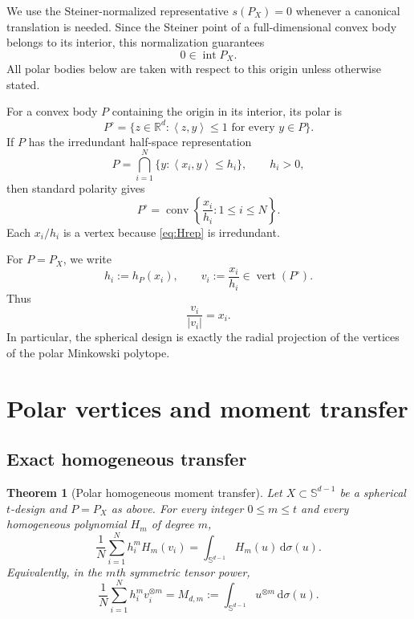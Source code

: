 \documentclass[11pt]{amsart}
\newtheorem{theorem}{Theorem}[section]
\theoremstyle{definition}
\theoremstyle{remark}
\newcommand{\R}{\mathbb R}
\newcommand{\Sph}{\mathbb S}
\newcommand{\conv}{\operatorname{conv}}
\newcommand{\Verts}{\operatorname{vert}}
\newcommand{\dd}{\,\mathrm d}
\newcommand{\ip}[2]{\left\langle #1,#2\right\rangle}
\begin{document}
We use the Steiner-normalized representative $s(P_X)=0$ whenever a canonical translation is needed.  Since the Steiner point of a full-dimensional convex body belongs to its interior, this normalization guarantees
\[
 0\in\operatorname{int}P_X.
\]
All polar bodies below are taken with respect to this origin unless otherwise stated.

For a convex body $P$ containing the origin in its interior, its polar is
\[
 P^\circ=\{z\in\R^d:\ip{z}{y}\le1\text{ for every }y\in P\}.
\]
If $P$ has the irredundant half-space representation
\begin{equation}\label{eq:Hrep}
 P=\bigcap_{i=1}^N\{y:\ip{x_i}{y}\le h_i\},
 \qquad h_i>0,
\end{equation}
then standard polarity gives
\begin{equation}\label{eq:polarvertices}
 P^\circ=\conv\left\{\frac{x_i}{h_i}:1\le i\le N\right\}.
\end{equation}
Each $x_i/h_i$ is a vertex because \eqref{eq:Hrep} is irredundant.

For $P=P_X$, we write
\[
 h_i:=h_P(x_i),
 \qquad
 v_i:=\frac{x_i}{h_i}\in\Verts(P^\circ).
\]
Thus
\begin{equation}\label{eq:radialprojection}
 \frac{v_i}{|v_i|}=x_i.
\end{equation}
In particular, the spherical design is exactly the radial projection of the vertices of the polar Minkowski polytope.

\section{Polar vertices and moment transfer}
\label{sec:moment}

\subsection{Exact homogeneous transfer}

\begin{theorem}[Polar homogeneous moment transfer]\label{thm:graded}
Let $X\subset\Sph^{d-1}$ be a spherical $t$-design and $P=P_X$ as above.  For every integer $0\le m\le t$ and every homogeneous polynomial $H_m$ of degree $m$,
\begin{equation}\label{eq:graded}
 \boxed{
 \frac1N\sum_{i=1}^N h_i^mH_m(v_i)
 =\int_{\Sph^{d-1}}H_m(u)\dd\sigma(u).}
\end{equation}
Equivalently, in the $m$th symmetric tensor power,
\begin{equation}\label{eq:tensorgraded}
 \boxed{
 \frac1N\sum_{i=1}^N h_i^m v_i^{\otimes m}
 =M_{d,m}:=\int_{\Sph^{d-1}}u^{\otimes m}\dd\sigma(u).}
\end{equation}
\end{theorem}
\end{document}
